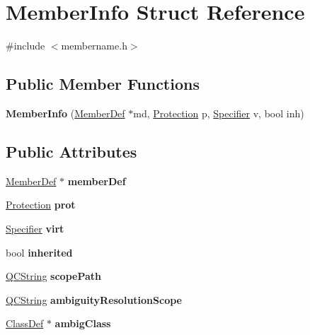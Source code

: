 \hypertarget{struct_member_info}{}\section{Member\+Info Struct Reference}
\label{struct_member_info}


{\ttfamily \#include $<$membername.\+h$>$}

\subsection*{Public Member Functions}
\begin{DoxyCompactItemize}
\item 
\mbox{\label{struct_member_info_a89177bbf51a9fcc197e17a657dd158d8}} 
{\bfseries Member\+Info} (\mbox{\hyperlink{class_member_def}{Member\+Def}} $\ast$md, \mbox{\hyperlink{types_8h_a90e352184df58cd09455fe9996cd4ded}{Protection}} p, \mbox{\hyperlink{types_8h_ab16236bdd10ddf4d73a9847350f0017e}{Specifier}} v, bool inh)
\end{DoxyCompactItemize}
\subsection*{Public Attributes}
\begin{DoxyCompactItemize}
\item 
\mbox{\label{struct_member_info_aa3e6c8da8c43f5b7c4b257161d55f56e}} 
\mbox{\hyperlink{class_member_def}{Member\+Def}} $\ast$ {\bfseries member\+Def}
\item 
\mbox{\label{struct_member_info_acf86b775d4fb20140c6510e843b5d9b6}} 
\mbox{\hyperlink{types_8h_a90e352184df58cd09455fe9996cd4ded}{Protection}} {\bfseries prot}
\item 
\mbox{\label{struct_member_info_abcad9848a77db55ca329fbd675c5d2c5}} 
\mbox{\hyperlink{types_8h_ab16236bdd10ddf4d73a9847350f0017e}{Specifier}} {\bfseries virt}
\item 
\mbox{\label{struct_member_info_a4fb5f7b4dbec176b26cbbcb04b7ea981}} 
bool {\bfseries inherited}
\item 
\mbox{\label{struct_member_info_abff55577ccd419a0173058f1f0cb5d72}} 
\mbox{\hyperlink{class_q_c_string}{Q\+C\+String}} {\bfseries scope\+Path}
\item 
\mbox{\label{struct_member_info_a5dbddc57482c0db5fcca254805eddc44}} 
\mbox{\hyperlink{class_q_c_string}{Q\+C\+String}} {\bfseries ambiguity\+Resolution\+Scope}
\item 
\mbox{\label{struct_member_info_aa287cf44a7e8a776aa1cfbc815cad862}} 
\mbox{\hyperlink{class_class_def}{Class\+Def}} $\ast$ {\bfseries ambig\+Class}
\end{DoxyCompactItemize}


